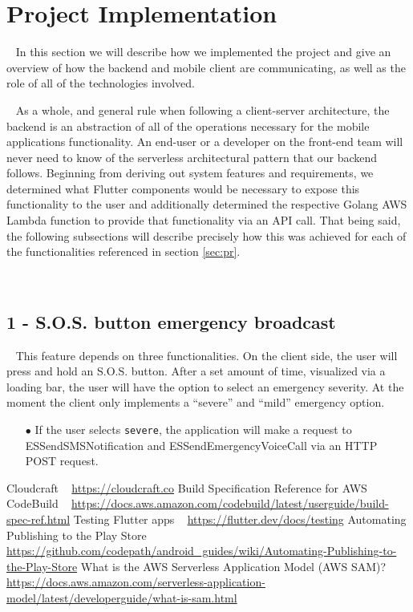 \documentclass[10pt, a4paper]{article}
\begin{document}
\section{Project Implementation}
\par ~ In this section we will describe how we implemented the project and give an overview of how the backend and mobile client are communicating, as well as the role of all of the technologies involved. 
\par ~ As a whole, and general rule when following a client-server architecture, the backend is an abstraction of all of the operations necessary for the mobile applications functionality. An end-user or a developer on the front-end team will never need to know of the serverless architectural pattern \cite{two} that our backend follows. Beginning from deriving out system features and requirements, we determined what Flutter components would be necessary to expose this functionality to the user and additionally determined the respective Golang AWS Lambda function to provide that functionality via an API call. That being said, the following subsections will describe precisely how this was achieved for each of the functionalities referenced in section \ref{sec:pr}.

\
\subsection{1 - S.O.S. button emergency broadcast} 
\par ~ This feature depends on three functionalities. On the client side, the user will press and hold an S.O.S. button. After a set amount of time, visualized via a loading bar, the user will have the option to select an emergency severity. At the moment the client only implements a ``severe'' and ``mild'' emergency option.
	\begin{itemize}
		\item[$\bullet$] If the user selects \texttt{severe}, the application will make a request to ESSendSMSNotification and ESSendEmergencyVoiceCall via an HTTP POST request. 
	\end{itemize}





\begin{thebibliography}{9}
Cloudcraft ~ \url{https://cloudcraft.co}
Build Specification Reference for AWS CodeBuild ~ \url{https://docs.aws.amazon.com/codebuild/latest/userguide/build-spec-ref.html}
\bibitem{three}
Testing Flutter apps ~ \url{https://flutter.dev/docs/testing}
Automating Publishing to the Play Store ~ \url{https://github.com/codepath/android_guides/wiki/Automating-Publishing-to-the-Play-Store}
\bibitem{five}
What is the AWS Serverless Application Model (AWS SAM)? ~ \url{https://docs.aws.amazon.com/serverless-application-model/latest/developerguide/what-is-sam.html}
\end{thebibliography}
\end{document}
